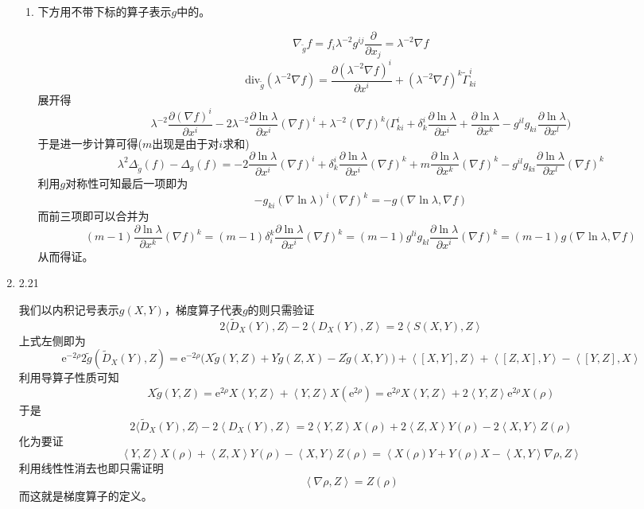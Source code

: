 \documentclass[a4paper,UTF8,fontset=windows,10pt]{ctexart}
\newcommand*{\er}{\mathrm{e}}
\begin{document}
\begin{enumerate}
\begin{enumerate}[(1)]
        \item 下方用不带下标的算子表示$g$中的。
        
        $$\nabla_{\tilde{g}}f=f_i\lambda^{-2}g^{ij}\frac{\partial}{\partial x_j}=\lambda^{-2}\nabla f$$
        $$\mathrm{div}_{\tilde{g}}(\lambda^{-2}\nabla f)=\frac{\partial(\lambda^{-2}\nabla f)^i}{\partial x^i}+(\lambda^{-2}\nabla f)^k\tilde{\Gamma}^i_{ki}$$
        展开得
        $$\lambda^{-2}\frac{\partial(\nabla f)^i}{\partial x^i}-2\lambda^{-2}\frac{\partial\ln\lambda}{\partial x^i}(\nabla f)^i+\lambda^{-2}(\nabla f)^k\bigg(\Gamma_{ki}^i+\delta_k^i\frac{\partial\ln\lambda}{\partial x^i}+\frac{\partial\ln\lambda}{\partial x^k}-g^{il}g_{ki}\frac{\partial\ln\lambda}{\partial x^l}\bigg)$$
        于是进一步计算可得($m$出现是由于对$i$求和)
        $$\lambda^2\Delta_{\tilde{g}}(f)-\Delta_g(f)=-2\frac{\partial\ln\lambda}{\partial x^i}(\nabla f)^i+\delta_k^i\frac{\partial\ln\lambda}{\partial x^i}(\nabla f)^k+m\frac{\partial\ln\lambda}{\partial x^k}(\nabla f)^k-g^{il}g_{ki}\frac{\partial\ln\lambda}{\partial x^l}(\nabla f)^k$$
        利用$g$对称性可知最后一项即为
        $$-g_{ki}(\nabla\ln\lambda)^i(\nabla f)^k=-g(\nabla\ln\lambda,\nabla f)$$
        而前三项即可以合并为
        $$(m-1)\frac{\partial\ln\lambda}{\partial x^k}(\nabla f)^k=(m-1)\delta_i^k\frac{\partial\ln\lambda}{\partial x^i}(\nabla f)^k=(m-1)g^{li}g_{kl}\frac{\partial\ln\lambda}{\partial x^i}(\nabla f)^k=(m-1)g(\nabla\ln\lambda,\nabla f)$$
        从而得证。
    \end{enumerate}
    
    \item 2.21
    
    我们以内积记号表示$g(X,Y)$，梯度算子代表$g$的则只需验证
    $$2\langle\tilde{D}_X(Y),Z\rangle-2\left<D_X(Y),Z\right>=2\left<S(X,Y),Z\right>$$
    上式左侧即为
    $$\er^{-2\rho}2\tilde{g}(\tilde{D}_X(Y),Z)=\er^{-2\rho}\big(X\tilde{g}(Y,Z)+Y\tilde{g}(Z,X)-Z\tilde{g}(X,Y)\big)+\left<[X,Y],Z\right>+\left<[Z,X],Y\right>-\left<[Y,Z],X\right>$$
    利用导算子性质可知
    $$X\tilde{g}(Y,Z)=\er^{2\rho}X\left<Y,Z\right>+\left<Y,Z\right>X(\er^{2\rho})=\er^{2\rho}X\left<Y,Z\right>+2\left<Y,Z\right>\er^{2\rho}X(\rho)$$
    于是
    $$2\langle\tilde{D}_X(Y),Z\rangle-2\left<D_X(Y),Z\right>=2\left<Y,Z\right>X(\rho)+2\left<Z,X\right>Y(\rho)-2\left<X,Y\right>Z(\rho)$$
    化为要证
    $$\left<Y,Z\right>X(\rho)+\left<Z,X\right>Y(\rho)-\left<X,Y\right>Z(\rho)=\left<X(\rho)Y+Y(\rho)X-\left<X,Y\right>\nabla\rho,Z\right>$$
    利用线性性消去也即只需证明
    $$\left<\nabla\rho,Z\right>=Z(\rho)$$
    而这就是梯度算子的定义。
    

\end{enumerate}
\end{document}
